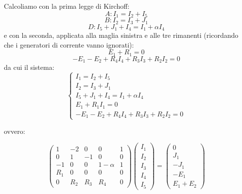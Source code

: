 \documentclass[a4paper,11pt]{article}
\begin{document}
Calcoliamo con la prima legge di Kirchoff:
$$
A: I_1 = I_2 + I_5
$$
$$
B: I_2 = I_3 + J_1
$$
$$
D: I_5 + J_1 + I_4 = I_1 + \alpha I_4
$$
e con la seconda, applicata alla maglia sinistra e alle tre rimanenti (ricordando che i generatori di corrente vanno ignorati):
$$
E_1 + R_1 = 0
$$
$$
-E_1 - E_2 + R_4 I_4 + R_3 I_3 + R_2 I_2 = 0
$$
da cui il sistema:
\[
	\begin{cases}			
I_1 = I_2 + I_5 \\ 
I_2 = I_3 + J_1 \\ 
I_5 + J_1 + I_4 = I_1 + \alpha I_4 \\
E_1 + R_1 I_1 = 0 \\ 
-E_1 - E_2 + R_4 I_4 + R_3 I_3 + R_2 I_2 = 0 
	\end{cases}
\]

ovvero:

\[
\begin{pmatrix}
	1 & -2 & 0 & 0 & 1 \\ 
	0 & 1 & -1 & 0 & 0 \\ 
	-1 & 0 & 0 & 1 - \alpha & 1 \\ 
	R_1 & 0 & 0 & 0 & 0 \\
	0 & R_2 & R_3 & R_4 & 0
\end{pmatrix} 
\begin{pmatrix}
		I_1 \\
		I_2 \\
		I_3 \\
		I_4 \\
		I_5
\end{pmatrix} 
= 
\begin{pmatrix}
	0 \\ 
	J_1 \\ 
	-J_1 \\ 
	-E_1 \\ 
	E_1 + E_2
\end{pmatrix}
\]
\end{document}
